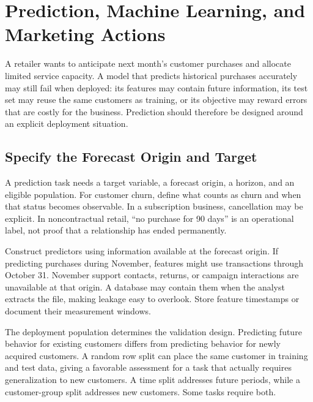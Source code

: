 \hypertarget{M07-m7.-prediction-machine-learning-and-marketing-actions}{%
\chapter{Prediction, Machine Learning, and Marketing
Actions}\label{M07-m7.-prediction-machine-learning-and-marketing-actions}}

\noindent A retailer wants to anticipate next month's customer purchases and
allocate limited service capacity. A model that predicts historical
purchases accurately may still fail when deployed: its features may
contain future information, its test set may reuse the same customers as
training, or its objective may reward errors that are costly for the
business. Prediction should therefore be designed around an explicit
deployment situation.

\hypertarget{M07-specify-the-forecast-origin-and-target}{%
\section{Specify the Forecast Origin and
Target}\label{M07-specify-the-forecast-origin-and-target}}

\noindent A prediction task needs a target variable, a forecast origin, a horizon,
and an eligible population. For customer churn, define what counts as
churn and when that status becomes observable. In a subscription
business, cancellation may be explicit. In noncontractual retail, ``no
purchase for 90 days'' is an operational label, not proof that a
relationship has ended permanently.

Construct predictors using information available at the forecast origin.
If predicting purchases during November, features might use transactions
through October 31. November support contacts, returns, or campaign
interactions are unavailable at that origin. A database may contain them
when the analyst extracts the file, making leakage easy to overlook.
Store feature timestamps or document their measurement windows.

The deployment population determines the validation design. Predicting
future behavior for existing customers differs from predicting behavior
for newly acquired customers. A random row split can place the same
customer in training and test data, giving a favorable assessment for a
task that actually requires generalization to new customers. A time
split addresses future periods, while a customer-group split addresses
new customers. Some tasks require both.

